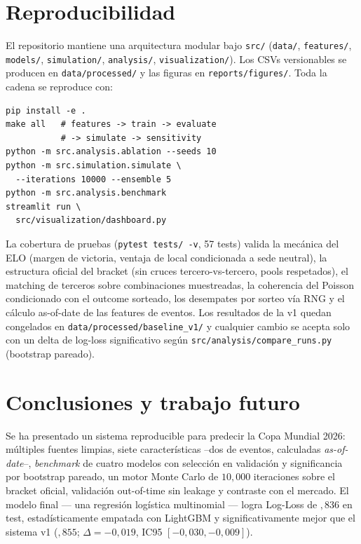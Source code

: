 \documentclass[conference]{IEEEtran}
\begin{document}
\section{Reproducibilidad}
\label{sec:reproducibility}

El repositorio mantiene una arquitectura modular bajo \texttt{src/}
(\texttt{data/}, \texttt{features/}, \texttt{models/}, \texttt{simulation/},
\texttt{analysis/}, \texttt{visualization/}). Los CSVs versionables
se producen en \texttt{data/processed/} y las figuras
en \texttt{reports/figures/}. Toda la cadena se reproduce con:

\begin{verbatim}
pip install -e .
make all   # features -> train -> evaluate
           # -> simulate -> sensitivity
python -m src.analysis.ablation --seeds 10
python -m src.simulation.simulate \
  --iterations 10000 --ensemble 5
python -m src.analysis.benchmark
streamlit run \
  src/visualization/dashboard.py
\end{verbatim}

La cobertura de pruebas (\texttt{pytest tests/ -v}, 57 tests) valida la
mec\'anica del ELO (margen de victoria, ventaja de local condicionada a
sede neutral), la estructura oficial del bracket (sin cruces
tercero-vs-tercero, pools respetados), el matching de terceros sobre
combinaciones muestreadas, la coherencia del Poisson condicionado con el
outcome sorteado, los desempates por sorteo v\'ia RNG y el c\'alculo
as-of-date de las features de eventos. Los resultados de la v1 quedan
congelados en \texttt{data/processed/baseline\_v1/} y cualquier cambio se
acepta solo con un delta de log-loss significativo seg\'un
\texttt{src/analysis/compare\_runs.py} (bootstrap pareado).

\section{Conclusiones y trabajo futuro}
\label{sec:conclusion}

Se ha presentado un sistema reproducible para predecir la Copa Mundial
2026: m\'ultiples fuentes limpias, siete caracter\'isticas --dos de
eventos, calculadas \emph{as-of-date}--, \emph{benchmark} de cuatro
modelos con selecci\'on en validaci\'on y significancia por bootstrap
pareado, un motor Monte Carlo de $10{,}000$ iteraciones sobre el bracket
oficial, validaci\'on out-of-time sin leakage y contraste con el mercado.
El modelo final --- una regresi\'on log\'istica multinomial --- logra
Log-Loss de ${,}836$ en test, estad\'isticamente empatada con LightGBM y
significativamente mejor que el sistema v1 (${,}855$;
$\Delta = -0{,}019$, IC95 $[-0{,}030, -0{,}009]$).
\end{document}
